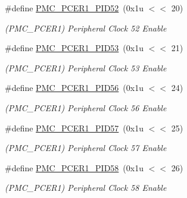 \begin{DoxyCompactItemize}
\mbox{\label{group__SAMS70__PMC_gaeb901f7df5ece868c18ca3639243d086}} 
\#define \mbox{\hyperlink{group__SAMS70__PMC_gaeb901f7df5ece868c18ca3639243d086}{P\+M\+C\+\_\+\+P\+C\+E\+R1\+\_\+\+P\+I\+D52}}~(0x1u $<$$<$ 20)
\begin{DoxyCompactList}\small\item\em (P\+M\+C\+\_\+\+P\+C\+E\+R1) Peripheral Clock 52 Enable \end{DoxyCompactList}\item 
\mbox{\label{group__SAMS70__PMC_ga8b8a346dd4009ecfef9c1575ecffd890}} 
\#define \mbox{\hyperlink{group__SAMS70__PMC_ga8b8a346dd4009ecfef9c1575ecffd890}{P\+M\+C\+\_\+\+P\+C\+E\+R1\+\_\+\+P\+I\+D53}}~(0x1u $<$$<$ 21)
\begin{DoxyCompactList}\small\item\em (P\+M\+C\+\_\+\+P\+C\+E\+R1) Peripheral Clock 53 Enable \end{DoxyCompactList}\item 
\mbox{\label{group__SAMS70__PMC_ga30b2500985269dae733e4d36b1e725cb}} 
\#define \mbox{\hyperlink{group__SAMS70__PMC_ga30b2500985269dae733e4d36b1e725cb}{P\+M\+C\+\_\+\+P\+C\+E\+R1\+\_\+\+P\+I\+D56}}~(0x1u $<$$<$ 24)
\begin{DoxyCompactList}\small\item\em (P\+M\+C\+\_\+\+P\+C\+E\+R1) Peripheral Clock 56 Enable \end{DoxyCompactList}\item 
\mbox{\label{group__SAMS70__PMC_ga745b950a0d2ffe63529fc9c9ebed2ac6}} 
\#define \mbox{\hyperlink{group__SAMS70__PMC_ga745b950a0d2ffe63529fc9c9ebed2ac6}{P\+M\+C\+\_\+\+P\+C\+E\+R1\+\_\+\+P\+I\+D57}}~(0x1u $<$$<$ 25)
\begin{DoxyCompactList}\small\item\em (P\+M\+C\+\_\+\+P\+C\+E\+R1) Peripheral Clock 57 Enable \end{DoxyCompactList}\item 
\mbox{\label{group__SAMS70__PMC_ga59642f0dc0deae066913275e09f98978}} 
\#define \mbox{\hyperlink{group__SAMS70__PMC_ga59642f0dc0deae066913275e09f98978}{P\+M\+C\+\_\+\+P\+C\+E\+R1\+\_\+\+P\+I\+D58}}~(0x1u $<$$<$ 26)
\begin{DoxyCompactList}\small\item\em (P\+M\+C\+\_\+\+P\+C\+E\+R1) Peripheral Clock 58 Enable \end{DoxyCompactList}\item 
$$
\end{DoxyCompactItemize}
